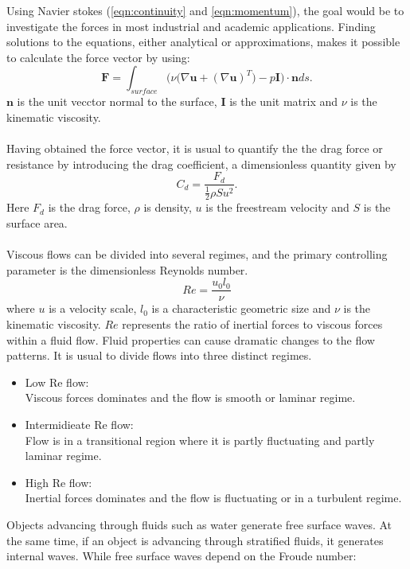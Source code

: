 \documentclass[a4paper, 12pt]{report}
\begin{document}
Using Navier stokes (\ref{eqn:continuity} and \ref{eqn:momentum}), the goal would be to investigate the forces in most industrial and academic applications. Finding solutions to the equations, either analytical or approximations, makes it possible to calculate the force vector by using:
\begin{equation}
\mathbf{F} = \int_{surface} \Big(\nu\big(\nabla \mathbf{u} + (\nabla \mathbf{u})^T\big) - p \mathbf{I}\Big) \cdot \mathbf{n} ds.
\label{eqn:forceVector}
\end{equation}
$\mathbf{n}$ is the unit vecctor normal to the surface, $\mathbf {I}$ is the unit matrix and $\nu$ is the kinematic viscosity. \\
\\
Having obtained the force vector, it is usual to quantify the the drag force or resistance by introducing the drag coefficient, a dimensionless quantity given by
\begin{equation}
C_d = \frac{F_d}{\frac{1}{2}\rho S u^2}.
\label{eqn:dragCoeff}
\end{equation}
Here $F_d$ is the drag force, $\rho$ is density, $u$ is the freestream velocity and $S$ is the surface area. \\
\\
Viscous flows can be divided into several regimes, and the primary controlling parameter is the dimensionless Reynolds number\cite{White}.
\begin{equation}
Re = \frac{u_0l_0}{\nu}
\label{eqn:ReynoldsNumber}
\end{equation}
where $u$ is a velocity scale, $l_0$ is a characteristic geometric size and $\nu$ is the kinematic viscosity. $Re$ represents the ratio of inertial forces to viscous forces within a fluid flow. Fluid properties can cause dramatic changes to the flow patterns. It is usual to divide flows into three distinct regimes.
\begin{itemize}
	\item Low Re flow: \\ Viscous forces dominates and the flow is smooth or laminar regime.
	\item Intermidieate Re flow: \\ Flow is in a transitional region where it is partly fluctuating and partly laminar regime.
	\item High Re flow: \\ Inertial forces dominates and the flow is fluctuating or in a turbulent regime.
\end{itemize} 
Objects advancing through fluids such as water generate free surface waves. At the same time, if an object is advancing through stratified fluids, it generates internal waves. While free surface waves depend on the Froude number: 
\end{document}
